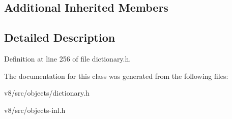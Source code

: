 \subsection*{Additional Inherited Members}


\subsection{Detailed Description}


Definition at line 256 of file dictionary.\+h.



The documentation for this class was generated from the following files\+:\begin{DoxyCompactItemize}
\item 
v8/src/objects/dictionary.\+h\item 
v8/src/objects-\/inl.\+h\end{DoxyCompactItemize}
